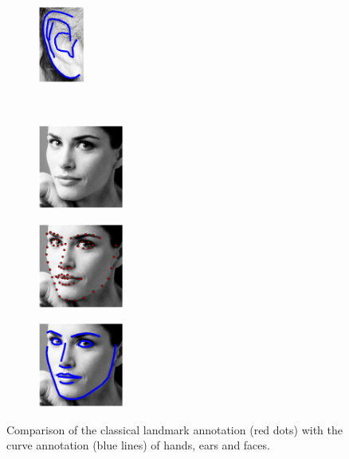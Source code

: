 \begin{figure}[t!]
\begin{subfigure}[b]{0.085\textwidth}
    \end{subfigure}
    \hfill
    \begin{subfigure}[b]{0.085\textwidth}
            \includegraphics[height=2.55cm]{resources/Fig_Intro/intro_1_2}
    \end{subfigure}
    \\
    \begin{subfigure}[b]{0.156\textwidth}
            \includegraphics[height=2.8cm]{resources/Fig_Intro/intro_0_0}
    \end{subfigure}
    \hfill
    \begin{subfigure}[b]{0.156\textwidth}
            \includegraphics[height=2.8cm]{resources/Fig_Intro/intro_0_1}
    \end{subfigure}
  	\hfill
    \begin{subfigure}[b]{0.156\textwidth}
            \includegraphics[height=2.8cm]{resources/Fig_Intro/intro_0_2}
    \end{subfigure}
    \caption{Comparison of the classical landmark annotation (red dots) with the curve annotation (blue lines) of hands, ears and faces.}
    \label{fig:intro}
\end{figure}



